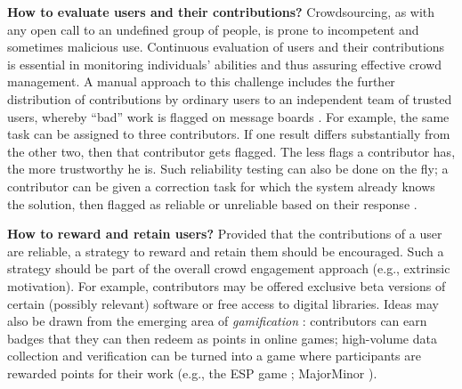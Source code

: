 \documentclass{sig-alternate}
\begin{document}
\textbf{How to evaluate users and their contributions?} Crowdsourcing, as with any open call to an undefined group of people, is prone to incompetent and sometimes malicious use. Continuous evaluation of users and their contributions is essential in monitoring individuals' abilities and thus assuring effective crowd management. A manual approach to this challenge includes the further distribution of contributions by ordinary users to an independent team of trusted users, whereby ``bad'' work is flagged on message boards \cite{doan2011}. For example, the same task can be assigned to three contributors. If one result differs substantially from the other two, then that contributor gets flagged. The less flags a contributor has, the more trustworthy he is. Such reliability testing can also be done on the fly; a contributor can be given a correction task for which the system already knows the solution, then flagged as reliable or unreliable based on their response \cite{doan2011}.    

\textbf{How to reward and retain users?} Provided that the contributions of a user are reliable, a strategy to reward and retain them should be encouraged. Such a strategy should be part of the overall crowd engagement approach (e.g., extrinsic motivation). For example, contributors may be offered exclusive beta versions of certain (possibly relevant) software or free access to digital libraries. Ideas may also be drawn from the emerging area of \emph{gamification} \cite{deterding2011}: contributors can earn badges that they can then redeem as points in online games; high-volume data collection and verification can be turned into a game where participants are rewarded points for their work (e.g., the ESP game \cite{ahn2004}; MajorMinor \cite{mandel2008}). 
\end{document}
